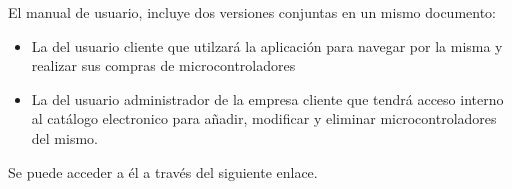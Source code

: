 El manual de usuario, incluye dos versiones conjuntas en un mismo documento:
\begin{itemize}
	\item La del usuario cliente que utilzará la aplicación para navegar por la misma y realizar sus compras de microcontroladores
	\item La del usuario administrador de la empresa cliente que tendrá acceso interno al catálogo electronico para añadir, modificar y eliminar microcontroladores del mismo.
\end{itemize}

Se puede acceder a él a través del siguiente enlace.
